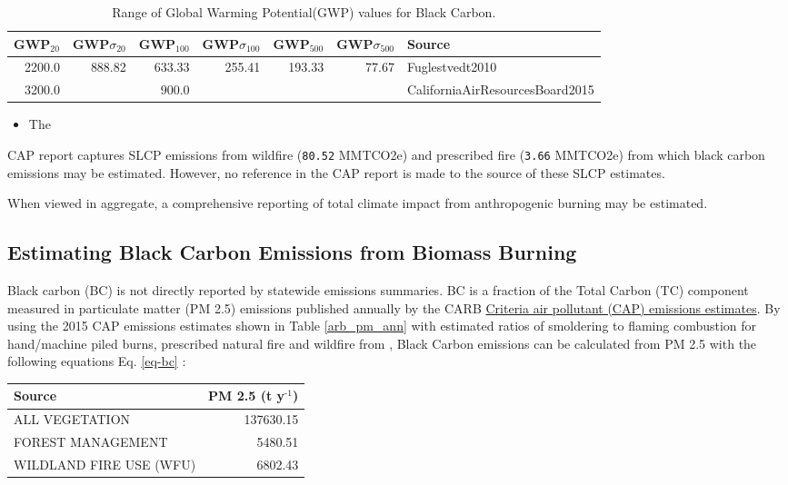 \documentclass[a4paper]{article}
\begin{document}
\begin{table}[htb]
\caption{Range of Global Warming Potential(GWP) values for Black Carbon.\label{tab:bc_gwp}}
\centering
\begin{tabular}{rrrrrrl}
GWP$_{\text{20}}$ & GWP$\sigma$$_{\text{20}}$ & GWP$_{\text{100}}$ & GWP$\sigma$$_{\text{100}}$ & GWP$_{\text{500}}$ & GWP$\sigma$$_{\text{500}}$ & Source\\
\hline
2200.0 & 888.82 & 633.33 & 255.41 & 193.33 & 77.67 & Fuglestvedt2010\\
3200.0 &  & 900.0 &  &  &  & CaliforniaAirResourcesBoard2015\\
\end{tabular}
\end{table}


\begin{itemize}
\item The \citet{CaliforniaAirResourcesBoard2015,CaliforniaAirResourcesBoard2016}
\end{itemize}
CAP report captures SLCP emissions from wildfire
(\texttt{80.52} MMTCO2e) and prescribed fire
(\texttt{3.66} MMTCO2e) from which black carbon emissions may be estimated. However, no reference in the CAP report is made to the source of these
SLCP estimates. 

When viewed in aggregate, a comprehensive reporting of total climate impact from anthropogenic burning may be estimated. 

\subsection{Estimating Black Carbon Emissions from Biomass Burning}
\label{sec-2-1}

Black carbon (BC) is not directly reported by statewide emissions summaries. BC is a fraction of the Total 
Carbon (TC) component measured in particulate matter (PM 2.5) emissions published annually by the CARB \href{http://www.arb.ca.gov/ei/emissiondata.htm}{Criteria air pollutant (CAP)
emissions estimates}. By using the 2015 CAP emissions estimates shown in Table \ref{arb_pm_ann} with estimated ratios of 
smoldering to flaming combustion for hand/machine piled burns, prescribed 
natural fire and wildfire from \citet{Ward1989}, Black Carbon emissions
can be calculated from PM
2.5 with the following equations Eq. \eqref{eq-bc} :


\begin{center}
\begin{tabular}{lr}
Source & PM 2.5 (t y$^{\text{-1}}$)\\
\hline
ALL VEGETATION & 137630.15\\
FOREST MANAGEMENT & 5480.51\\
WILDLAND FIRE USE (WFU) & 6802.43\\
\end{tabular}
\end{center}
\end{document}
